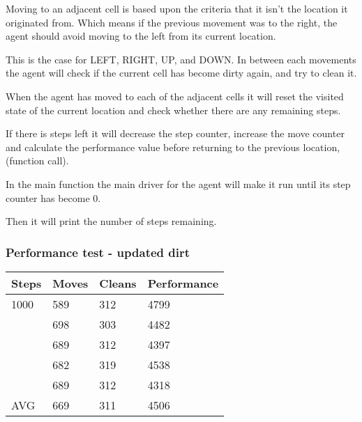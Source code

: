Moving to an adjacent cell is based upon the criteria that it isn't the location
it originated from. Which means if the previous movement was to the right, the
agent should avoid moving to the left from its current location.

This is the case for LEFT, RIGHT, UP, and DOWN.  In between each movements the
agent will check if the current cell has become dirty again, and try to clean
it.

When the agent has moved to each of the adjacent cells it will reset the visited
state of the current location and check whether there are any remaining steps.

If there is steps left it will decrease the step counter, increase the move
counter and calculate the performance value before returning to the previous
location, (function call).


In the main function the main driver for the agent will make it run until its
step counter has become 0.

Then it will print the number of steps remaining.

\subsubsection{Performance test - updated dirt}
\begin{longtable}{ p{} p{} p{} 
									 p{} }
Steps & Moves & Cleans	& Performance \\\hline
1000	& 589 & 312 & 4799 \\
 		 	& 698 & 303 & 4482 \\
 			& 689 & 312 & 4397 \\
 			& 682 & 319 & 4538 \\
 			& 689 & 312 & 4318 \\\hline
AVG		& 669 & 311 &	4506 \\\hline
\end{longtable}
